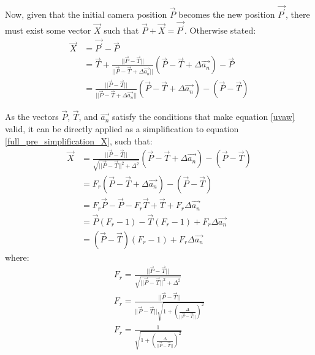 Now, given that the initial camera position $\vec{P}$ becomes the new position $\vec{P^\prime}$, there must exist some vector $\vec{X}$ such that $\vec{P} + \vec{X} = \vec{P^\prime}$. Otherwise stated:
\begin{align}
    \vec{X} &= \vec{P^\prime} - \vec{P}\nonumber\\
    &= \vec{T} + \frac{||\vec{P} - \vec{T}||}{||\vec{P} - \vec{T} + \Delta\vec{a_n}||}(\vec{P} - \vec{T} + \Delta\vec{a_n}) - \vec{P}\nonumber\\
    &= \frac{||\vec{P} - \vec{T}||}{||\vec{P} - \vec{T} + \Delta\vec{a_n}||}(\vec{P} - \vec{T} + \Delta\vec{a_n}) - (\vec{P} - \vec{T}) \label{full_pre_simplification_X}
\end{align}

As the vectors $\vec{P}$, $\vec{T}$, and $\vec{a_n}$ satisfy the conditions that make equation \ref{uvaw} valid, it can be directly applied as a simplification to equation \ref{full_pre_simplification_X}, such that:
\begin{align}
    \vec{X} &= \frac{||\vec{P} - \vec{T}||}{
        \sqrt{||\vec{P} - \vec{T}||^2 + \Delta^2}
    }(\vec{P} - \vec{T} + \Delta\vec{a_n}) - (\vec{P} - \vec{T})\nonumber\\
    &= F_r(\vec{P} - \vec{T} + \Delta\vec{a_n}) - (\vec{P} - \vec{T})\nonumber\\
    &= F_r\vec{P} - \vec{P} - F_r\vec{T} + \vec{T} + F_r\Delta\vec{a_n}\nonumber\\
    &= \vec{P}(F_r-1) - \vec{T}(F_r-1) + F_r\Delta\vec{a_n}\nonumber\\
    &= (\vec{P}-\vec{T})(F_r-1) + F_r\Delta\vec{a_n}
\end{align}
where:
\begin{align}
    F_r = \frac{||\vec{P} - \vec{T}||}{\sqrt{||\vec{P} - \vec{T}||^2 + \Delta^2}}\\
    F_r = \frac{||\vec{P} - \vec{T}||}{||\vec{P} - \vec{T}||\sqrt{
        1 + (\frac{\Delta}{||\vec{P} - \vec{T}||})^2}}\\
    F_r = \frac{1}{\sqrt{
        1 + (\frac{\Delta}{||\vec{P} - \vec{T}||})^2}}
\end{align}